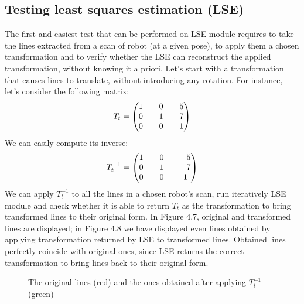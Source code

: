 \documentclass[a4paper, onecolumn]{report}
\begin{document}
\subsection{Testing least squares estimation (LSE)}
The first and easiest test that can be performed on LSE module requires to take the lines extracted from a scan of robot (at a given pose), to apply them a chosen transformation and to verify whether the LSE can reconstruct the applied transformation, without knowing it a priori.
Let's start with a transformation that causes lines to translate, without introducing any rotation. For instance, let's consider the following matrix:
\begin{equation}
	T_t = \left(\begin{matrix}1 && 0 && 5 \\ 0 && 1 && 7 \\ 0 && 0 && 1\end{matrix} \right) \notag
\end{equation}
We can easily compute its inverse:
\begin{equation}
	T_t^{-1} = \left(\begin{matrix}1 && 0 && -5 \\ 0 && 1 && -7 \\ 0 && 0 && 1\end{matrix} \right) \notag
\end{equation}
We can apply $T_t^{-1}$ to all the lines in a chosen robot's scan, run iteratively LSE module and check whether it is able to return $T_t$ as the transformation to bring transformed lines to their original form. In Figure 4.7, original and transformed lines are displayed; in Figure 4.8 we have displayed even lines obtained by applying transformation returned by LSE to transformed lines. Obtained lines perfectly coincide with original ones, since LSE returns the correct transformation to bring lines back to their original form.
\begin{figure}[htbp]
\centering
{}
\caption{The original lines (red) and the ones obtained after applying $T_t^{-1}$ (green)}
\end{figure}
\end{document}
